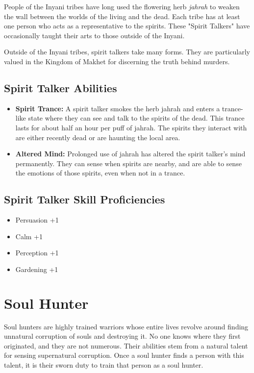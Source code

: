 \begin{multicols}{2}
People of the Inyani tribes have long used the flowering herb \textit{jahrah} 
to weaken the wall between the worlds of the living and the dead. Each tribe
has at least one person who acts as a representative to the spirits. These
"Spirit Talkers" have occasionally taught their arts to those outside of the
Inyani.

Outside of the Inyani tribes, spirit talkers take many forms. They are
particularly valued in the Kingdom of Makhet for discerning the truth
behind murders.

\subsection{Spirit Talker Abilities}

\begin{itemize}
  \item \textbf{Spirit Trance:} A spirit talker smokes the herb jahrah and
    enters a trance-like state where they can see and talk to the spirits of
    the dead. This trance lasts for about half an hour per puff of jahrah. The
    spirits they interact with are either recently dead or are haunting the
    local area.
  \item \textbf{Altered Mind:} Prolonged use of jahrah has altered the spirit
    talker's mind permanently. They can sense when spirits are nearby, and are
    able to sense the emotions of those spirits, even when not in a trance.
\end{itemize}

\subsection{Spirit Talker Skill Proficiencies}

\begin{itemize}
  \item Persuasion +1
  \item Calm +1
  \item Perception +1
  \item Gardening +1
\end{itemize}

\section{Soul Hunter}

Soul hunters are highly trained warriors whose entire lives revolve around
finding unnatural corruption of souls and destroying it. No one knows where
they first originated, and they are not numerous. Their abilities stem from
a natural talent for sensing supernatural corruption. Once a soul hunter 
finds a person with this talent, it is their sworn duty to train that person
as a soul hunter.


\end{multicols}
